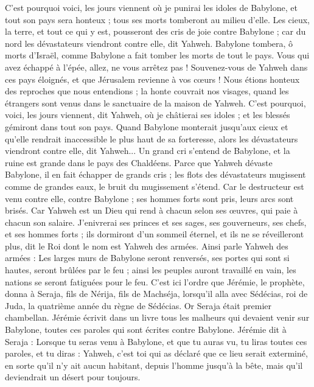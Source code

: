 \begin{multicols}{2}
C'est pourquoi voici, les jours viennent où je punirai les idoles de Babylone, et tout son pays sera honteux ; tous ses morts tomberont au milieu d'elle.
Les cieux, la terre, et tout ce qui y est, pousseront des cris de joie contre Babylone ; car du nord les dévastateurs viendront contre elle, dit Yahweh.
Babylone tombera, ô morts d'Israël, comme Babylone a fait tomber les morts de tout le pays.
Vous qui avez échappé à l'épée, allez, ne vous arrêtez pas ! Souvenez-vous de Yahweh dans ces pays éloignés, et que Jérusalem revienne à vos cœurs !
Nous étions honteux des reproches que nous entendions ; la honte couvrait nos visages, quand les étrangers sont venus dans le sanctuaire de la maison de Yahweh.
C'est pourquoi, voici, les jours viennent, dit Yahweh, où je châtierai ses idoles ; et les blessés gémiront dans tout son pays.
Quand Babylone monterait jusqu'aux cieux et qu'elle rendrait inaccessible le plus haut de sa forteresse, alors les dévastateurs viendront contre elle, dit Yahweh...
Un grand cri s'entend de Babylone, et la ruine est grande dans le pays des Chaldéens.
Parce que Yahweh dévaste Babylone, il en fait échapper de grands cris ; les flots des dévastateurs mugissent comme de grandes eaux, le bruit du mugissement s'étend.
Car le destructeur est venu contre elle, contre Babylone ; ses hommes forts sont pris, leurs arcs sont brisés. Car Yahweh est un Dieu qui rend à chacun selon ses œuvres, qui paie à chacun son salaire.
J'enivrerai ses princes et ses sages, ses gouverneurs, ses chefs, et ses hommes forts ; ils dormiront d'un sommeil éternel, et ils ne se réveilleront plus, dit le Roi dont le nom est Yahweh des armées.
Ainsi parle Yahweh des armées : Les larges murs de Babylone seront renversés, ses portes qui sont si hautes, seront brûlées par le feu ; ainsi les peuples auront travaillé en vain, les nations se seront fatiguées pour le feu.
C'est ici l'ordre que Jérémie, le prophète, donna à Seraja, fils de Nérija, fils de Machséja, lorsqu'il alla avec Sédécias, roi de Juda, la quatrième année du règne de Sédécias. Or Seraja était premier chambellan.
Jérémie écrivit dans un livre tous les malheurs qui devaient venir sur Babylone, toutes ces paroles qui sont écrites contre Babylone.
Jérémie dit à Seraja : Lorsque tu seras venu à Babylone, et que tu auras vu, tu liras toutes ces paroles,
et tu diras : Yahweh, c'est toi qui as déclaré que ce lieu serait exterminé, en sorte qu'il n'y ait aucun habitant, depuis l'homme jusqu'à la bête, mais qu'il deviendrait un désert pour toujours.

\end{multicols}
